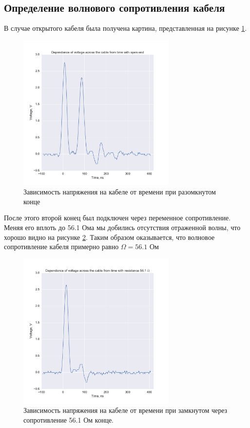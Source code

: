 \documentclass[a4paper, 12pt]{article}
\begin{document}
\subsection{Определение волнового сопротивления кабеля}

В случае открытого кабеля была получена картина, представленная на рисунке \ref{fig:pt_1_open}.

\begin{figure}[H]
	\centering
	\includegraphics[width=0.7\textwidth]{pt1_open.pdf}
	\caption{Зависимость напряжения на кабеле от времени при разомкнутом конце}
	\label{fig:pt_1_open}
\end{figure}

После этого второй конец был подключен через переменное сопротивление. Меняя его вплоть до 56.1 Ома мы добились отсутствия отраженной волны, что хорошо видно на рисунке \ref{fig:pt_1_resistance}. Таким образом оказывается, что волновое сопротивление кабеля примерно равно $\boxed{\Omega = 56.1 \text{ Ом}}$

\begin{figure}[H]
	\centering
	\includegraphics[width=0.7\textwidth]{pt_1_resistance.pdf}
	\caption{Зависимость напряжения на кабеле от времени при замкнутом через сопротивление 56.1 Ом конце.}
	\label{fig:pt_1_resistance}
\end{figure}
\end{document}
